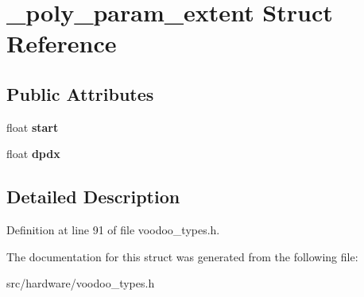 \hypertarget{struct__poly__param__extent}{\section{\-\_\-poly\-\_\-param\-\_\-extent Struct Reference}
\label{struct__poly__param__extent}
}
\subsection*{Public Attributes}
\begin{DoxyCompactItemize}
\item 
\hypertarget{struct__poly__param__extent_a2403a4fb32e2ccf4b77f2592d2b4397d}{float {\bfseries start}}\label{struct__poly__param__extent_a2403a4fb32e2ccf4b77f2592d2b4397d}

\item 
\hypertarget{struct__poly__param__extent_a3a79a91ca5822b5833fbbf344e90755f}{float {\bfseries dpdx}}\label{struct__poly__param__extent_a3a79a91ca5822b5833fbbf344e90755f}

\end{DoxyCompactItemize}


\subsection{Detailed Description}


Definition at line 91 of file voodoo\-\_\-types.\-h.



The documentation for this struct was generated from the following file\-:\begin{DoxyCompactItemize}
\item 
src/hardware/voodoo\-\_\-types.\-h\end{DoxyCompactItemize}
